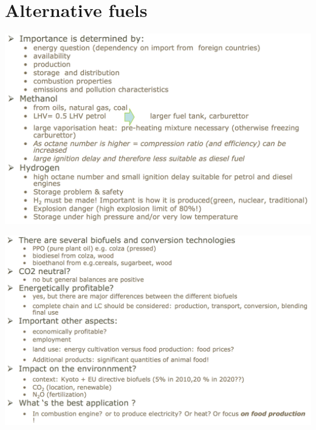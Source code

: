 	
\section{Alternative fuels}
	\begin{center}
	\begin{minipage}{0.4\textwidth}
	\includegraphics[scale=0.3]{ch3/8}
	\end{minipage}
		\begin{minipage}{0.5\textwidth}
	\includegraphics[scale=0.3]{ch3/9}
	\end{minipage}
	\end{center}














